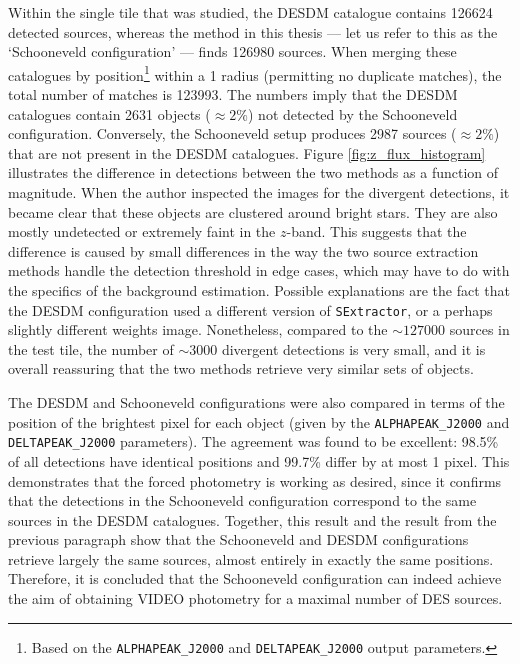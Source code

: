 Within the single tile that was studied, the DESDM catalogue contains \num{126 624} detected sources, whereas the \DESVIDEO method in this thesis --- let us refer to this as the `Schooneveld configuration' --- finds \num{126 980} sources. When merging these catalogues by position\footnote{Based on the \texttt{ALPHAPEAK\_J2000} and \texttt{DELTAPEAK\_J2000} output parameters.} within a \SI{1}{\arcsec} radius (permitting no duplicate matches), the total number of matches is \num{123 993}. The numbers imply that the DESDM catalogues contain 2631 objects ($\approx 2\%$) not detected by the Schooneveld configuration. Conversely, the Schooneveld setup produces 2987 sources ($\approx 2\%$) that are not present in the DESDM catalogues. Figure \ref{fig:z_flux_histogram} illustrates the difference in detections between the two methods as a function of magnitude. When the author inspected the images for the divergent detections, it became clear that these objects are clustered around bright stars. They are also mostly undetected or extremely faint in the $z$-band. This suggests that the difference is caused by small differences in the way the two source extraction methods handle the detection threshold in edge cases, which may have to do with the specifics of the background estimation. Possible explanations are the fact that the DESDM configuration used a different version of \texttt{SExtractor}, or a perhaps slightly different weights image. Nonetheless, compared to the $\sim127 000$ sources in the test tile, the number of $\sim3000$  divergent detections is very small, and it is overall reassuring that the two methods retrieve very similar sets of objects. \par








The DESDM and Schooneveld configurations were also compared in terms of the position of the brightest pixel for each object (given by the \texttt{ALPHAPEAK\_J2000} and \texttt{DELTAPEAK\_J2000} parameters). The agreement was found to be excellent: 98.5\% of all detections have identical positions and 99.7\% differ by at most 1 pixel. This demonstrates that the forced photometry is working as desired, since it confirms that the detections in the Schooneveld configuration correspond to the same sources in the DESDM catalogues. Together, this result and the result from the previous paragraph show that the Schooneveld and DESDM configurations retrieve largely the same sources, almost entirely in exactly the same positions. Therefore, it is concluded that the Schooneveld configuration can indeed achieve the aim of obtaining VIDEO photometry for a maximal number of DES sources. \par  


